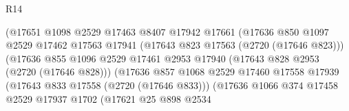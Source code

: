 \begin{lexlean}{R14}
\begin{coremodule}
                                                (@17651
                                                  @1098
                                                  @2529
                                                  @17463
                                                  @8407
                                                  @17942
                                                  @17661
                                                  (@17636
                                                    @850
                                                    @1097
                                                    @2529
                                                    @17462
                                                    @17563
                                                    @17941
                                                    (@17643 @823 @17563 (@2720 (@17646 @823)))
                                                    (@17636
                                                      @855
                                                      @1096
                                                      @2529
                                                      @17461
                                                      @2953
                                                      @17940
                                                      (@17643 @828 @2953 (@2720 (@17646 @828)))
                                                      (@17636
                                                        @857
                                                        @1068
                                                        @2529
                                                        @17460
                                                        @17558
                                                        @17939
                                                        (@17643 @833 @17558 (@2720 (@17646 @833)))
                                                        (@17636
                                                          @1066
                                                          @374
                                                          @17458
                                                          @2529
                                                          @17937
                                                          @1702
                                                          (@17621
                                                            @25
                                                            @898
                                                            @2534

\end{coremodule}
\end{lexlean}
